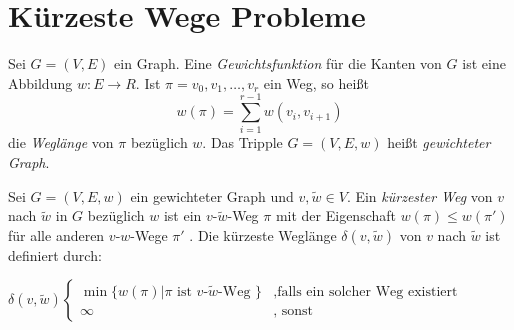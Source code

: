 \section{Kürzeste Wege Probleme}
\begin{definition}
Sei $G=(V,E)$ ein Graph. Eine \emph{Gewichtsfunktion} für die Kanten von $G$ ist eine Abbildung $w \colon E \to R$. Ist $\pi=v_0,v_1,\ldots,v_r$ ein Weg, so heißt
\[
w(\pi) = \sum_{i=1}^{r-1}w(v_i,v_{i+1})
\]
die \emph{Weglänge} von $\pi$ bezüglich $w$. Das Tripple $G=(V,E,w)$ heißt \emph{gewichteter Graph}. 
\end{definition}
\begin{definition}
	\label{def:negative_gewichte}
Sei $G=(V,E,w)$  ein gewichteter Graph und $v, \tilde{w} \in  V$. Ein \emph{kürzester Weg} von $v$ nach $\tilde{w}$  in $G$  bezüglich $w$ ist ein $v\text{-} \tilde{w}$-Weg $\pi$  mit der Eigenschaft $w(\pi) \le w(\pi')$  für alle anderen $v\text{-}w$-Wege $\pi'$ .
Die kürzeste Weglänge $\delta(v,\tilde{w})$  von $v$ nach $\tilde{w}$ ist definiert durch:

\begin{center}$\delta(v,\tilde{w}) \begin{cases}
	\min \{w(\pi) | \pi \text{ ist $v$-$\tilde{w}$-Weg  }\} &, \text{falls ein solcher Weg existiert} \\
	\infty &, \text{ sonst}
\end{cases}$ \end{center}
\end{definition}

